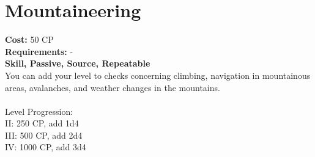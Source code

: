 \section{Mountaineering}
\textbf{Cost:} 50 CP\\
\textbf{Requirements:} -\\
\textbf{Skill, Passive, Source, Repeatable}\\
You can add your level to checks concerning climbing, navigation in mountainous areas, avalanches, and weather changes in the mountains.\\
\\
Level Progression:\\
II: 250 CP, add 1d4\\
III: 500 CP, add 2d4\\
IV: 1000 CP, add 3d4\\